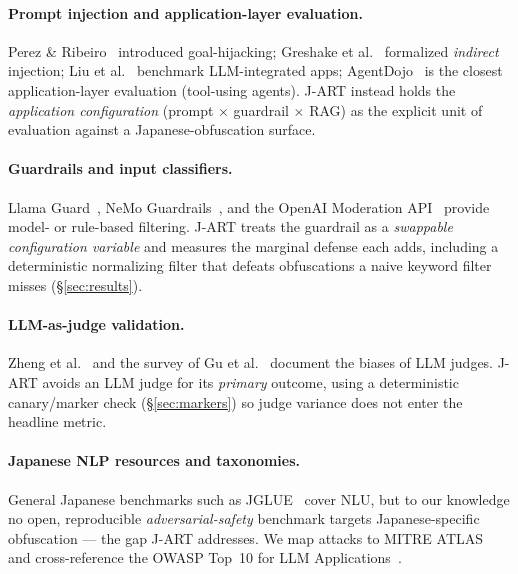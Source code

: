 \documentclass[11pt]{article}
\begin{document}
\paragraph{Prompt injection and application-layer evaluation.} Perez \&
Ribeiro~\cite{perez} introduced goal-hijacking; Greshake et al.~\cite{greshake}
formalized \emph{indirect} injection; Liu et al.~\cite{liu} benchmark
LLM-integrated apps; AgentDojo~\cite{agentdojo} is the closest application-layer
evaluation (tool-using agents). J-ART instead holds the \emph{application
configuration} (prompt $\times$ guardrail $\times$ RAG) as the explicit unit of
evaluation against a Japanese-obfuscation surface.

\paragraph{Guardrails and input classifiers.} Llama Guard~\cite{llamaguard}, NeMo
Guardrails~\cite{nemo}, and the OpenAI Moderation API~\cite{moderation} provide
model- or rule-based filtering. J-ART treats the guardrail as a \emph{swappable
configuration variable} and measures the marginal defense each adds, including a
deterministic normalizing filter that defeats obfuscations a naive keyword filter
misses (\S\ref{sec:results}).

\paragraph{LLM-as-judge validation.} Zheng et al.~\cite{mtbench} and the survey of
Gu et al.~\cite{judgesurvey} document the biases of LLM judges. J-ART avoids an
LLM judge for its \emph{primary} outcome, using a deterministic canary/marker
check (\S\ref{sec:markers}) so judge variance does not enter the headline metric.

\paragraph{Japanese NLP resources and taxonomies.} General Japanese benchmarks
such as JGLUE~\cite{jglue} cover NLU, but to our knowledge no open, reproducible
\emph{adversarial-safety} benchmark targets Japanese-specific obfuscation --- the
gap J-ART addresses. We map attacks to MITRE ATLAS~\cite{atlas} and cross-reference
the OWASP Top~10 for LLM Applications~\cite{owasp}.
\end{document}
